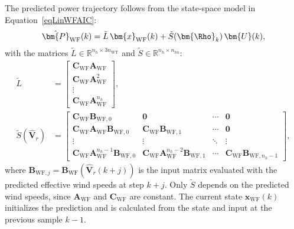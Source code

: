 The predicted power trajectory follows from the state-space model in Equation~\eqref{eqLinWFAIC}:
\begin{align*}
        \hat{\bm{P}}_{\text{WF}}(k) = \tilde{L}\, \bm{x}_{\text{WF}}(k) + \tilde{S}(\bm{\Rho}_k)\, \bm{U}(k),
\end{align*}
with the matrices $\tilde{L} \in \mathbb{R}^{n_h \times 3n_{\text{WT}}}$ and $\tilde{S} \in \mathbb{R}^{n_h \times n_{hu}}$:
\begin{equation} \label{eq:ltildeWF}
    \begin{aligned}
        \tilde{L} &=
        \begin{bmatrix}
            \bm{C}_{\text{WF}} \bm{A}_{\text{WF}} \\ \bm{C}_{\text{WF}} \bm{A}_{\text{WF}}^2 \\ \vdots \\ \bm{C}_{\text{WF}} \bm{A}_{\text{WF}}^{n_h}
        \end{bmatrix}, \\
        \tilde{S}(\hat{\bm{V}}_r) &=
        \begin{bmatrix}
            \bm{C}_{\text{WF}} \bm{B}_{\text{WF},0} & \bm{0} & \cdots & \bm{0} \\
            \bm{C}_{\text{WF}} \bm{A}_{\text{WF}} \bm{B}_{\text{WF},0} & \bm{C}_{\text{WF}} \bm{B}_{\text{WF},1} & \cdots & \bm{0} \\
            \vdots & \vdots & \ddots & \vdots \\
            \bm{C}_{\text{WF}} \bm{A}_{\text{WF}}^{n_h-1} \bm{B}_{\text{WF},0} & \bm{C}_{\text{WF}} \bm{A}_{\text{WF}}^{n_h-2} \bm{B}_{\text{WF},1} & \cdots & \bm{C}_{\text{WF}} \bm{B}_{\text{WF},n_h-1}
        \end{bmatrix},
    \end{aligned}
\end{equation}
where $\bm{B}_{\text{WF},j} = \bm{B}_{\text{WF}}(\hat{\bm{V}}_r(k+j))$ is the input matrix evaluated with the predicted effective wind speeds at step $k+j$. Only $\tilde{S}$ depends on the predicted wind speeds, since $\bm{A}_{\text{WF}}$ and $\bm{C}_{\text{WF}}$ are constant. The current state $\bm{x}_{\text{WF}}(k)$ initializes the prediction and is calculated from the state and input at the previous sample $k-1$.

